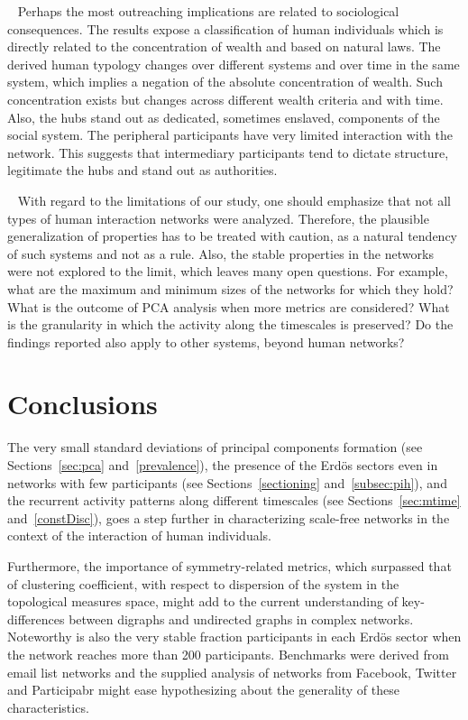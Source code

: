 \documentclass[%
aip,
jmp,%
amsmath,amssymb,
reprint,%
]{revtex4-1}
\begin{document}
 
Perhaps the most outreaching implications are related to sociological consequences. The results expose a classification of human individuals which is directly related to the concentration of wealth and based on natural laws. The derived human typology changes over different systems and over time in the same system, which implies a negation of the absolute concentration of wealth. Such concentration exists but changes across different wealth criteria and with time. Also, the hubs stand out as dedicated, sometimes enslaved,
components of the social system. The peripheral participants have very limited interaction with the network. This suggests that intermediary participants tend to dictate structure, legitimate the hubs and stand out as authorities.

 
With regard to the limitations of our study, one should emphasize that not all types of human interaction networks were analyzed. Therefore, the plausible generalization of properties has to be treated with caution, as a natural tendency of such systems and not as a rule. Also, the stable properties in the networks were not explored to the limit, which leaves many open questions. For example, what are the maximum and minimum sizes of the networks for which they hold? What is the outcome of PCA analysis when more metrics are considered? What is the granularity in which the activity along the timescales is preserved? Do the findings reported also apply to other systems, beyond human networks?

\section{Conclusions}\label{sec:conc}
The very small standard deviations of principal components formation
(see Sections~\ref{sec:pca} and~\ref{prevalence}),
the presence of the Erd\"os sectors even in networks with
few participants (see Sections~\ref{sectioning} and~\ref{subsec:pih}),
and the recurrent activity patterns along different timescales (see Sections~\ref{sec:mtime} and~\ref{constDisc}),
goes a step further in characterizing scale-free networks in the context
of the interaction of human individuals.

Furthermore, the importance of symmetry-related metrics,
which surpassed that of clustering coefficient,
with respect to dispersion of the system in the topological measures space,
might add to the current understanding of key-differences between digraphs and
undirected graphs in complex networks.
Noteworthy is also the very stable fraction participants in each Erd\"os sector when the network reaches more than 200 participants.
Benchmarks were derived from email list networks
and the supplied analysis of
networks from Facebook,
Twitter and Participabr might ease hypothesizing
about the generality of these characteristics.
\end{document}
